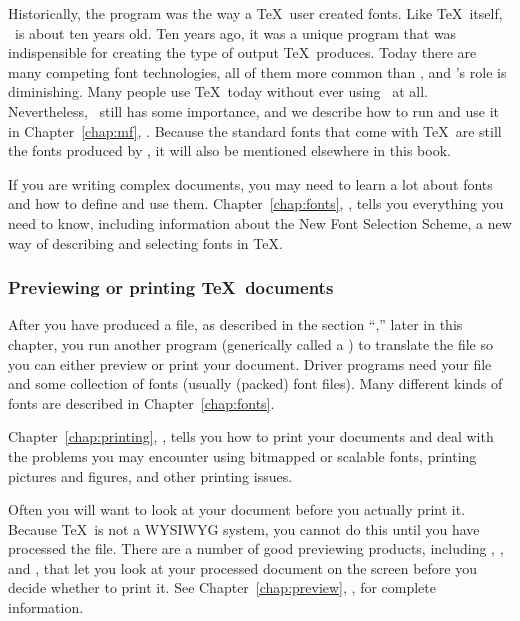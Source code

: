 Historically, the  program was the way a \TeX\ user created fonts.
Like \TeX\ itself, \MF\ is about ten years old.  Ten years ago, it was
a unique program that was indispensible for creating the type of
output \TeX\ produces.  Today there are many competing font
technologies, all of them more common than \MF, and \MF's role is
diminishing.  Many people use \TeX\ today without ever using \MF\ at
all.  Nevertheless, \MF\ still has some importance, and we describe
how to run and use it in Chapter~\ref{chap:mf},
{\it{}}.  Because the standard fonts that come
with \TeX\ are still the fonts produced by \MF, it will also be
mentioned elsewhere in this book.

If you are writing complex documents, you may need to learn a lot about
fonts and how to define and use them.  Chapter~\ref{chap:fonts},
\textit{},
tells you everything you need to know, including information about 
the New Font Selection Scheme,
a new way of describing and selecting fonts in \TeX.

\subsubsection{Previewing or printing \TeX\ documents}
\label{subsubsec:printpreview}

After you have produced a  file, as described in the section
``,'' later in this chapter, you run another program (generically
called a \dvidriver) to 
translate the  file so you can either preview
or print your document.  Driver programs need your  file and some
collection of fonts 
(usually  (packed) font 
files).  Many different kinds of fonts are described in
Chapter~\ref{chap:fonts}.

Chapter~\ref{chap:printing}, {\it{}}, tells you
how to print your 
documents and deal with the problems you may
encounter using bitmapped or scalable fonts, printing pictures and figures,
and other printing issues.

Often you will want to look at your document before you actually print it.
Because \TeX\ is not a WYSIWYG system, you cannot do this until you have processed the 
 file.  There are a number of 
good previewing products,
including , , 
and , that let you look at
your processed document on the screen before you decide whether to print it.
See Chapter~\ref{chap:preview}, {\it{}}, for complete
information.

